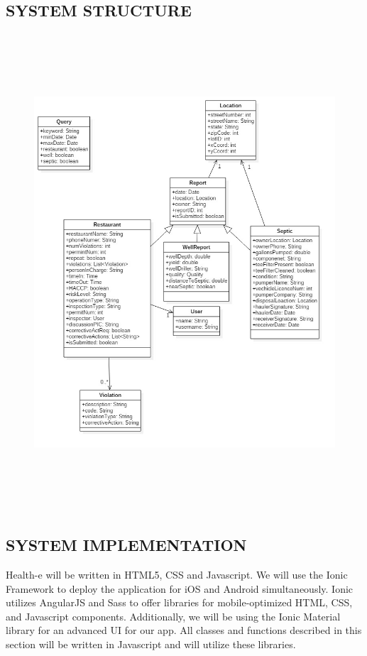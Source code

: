 \documentclass[twoside,letterpaper]{article}
\begin{document}
\subsection[SYSTEM STRUCTURE]{\rmfamily\bfseries\color{black}
SYSTEM STRUCTURE}
\begin{figure}[h!]
\centering
\includegraphics[width=6in,height=7in]{uml.jpg}
\end{figure}

\subsection[SYSTEM IMPLEMENTATION]{\rmfamily\bfseries\color{black}
SYSTEM IMPLEMENTATION}
{\rmfamily\color{black}
Health-e will be written in HTML5, CSS and Javascript. We will use the Ionic Framework to deploy the application for iOS and Android simultaneously. Ionic utilizes AngularJS and Sass to offer libraries for mobile-optimized HTML, CSS, and Javascript components. Additionally, we will be using the Ionic Material library for an advanced UI for our app. All classes and functions described in this section will be written in Javascript and will utilize these libraries.
}
\end{document}

